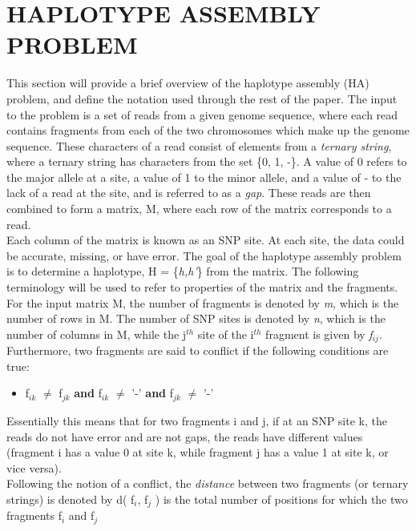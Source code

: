 \documentclass[10pt,twocolumn]{witseiepaper}
\begin{document}

\section{HAPLOTYPE ASSEMBLY PROBLEM}

This section will provide a brief overview of the haplotype assembly (HA) problem, and define the
notation used through the rest of the paper. The input to the problem is a set of reads from a given genome
sequence, where each read contains fragments from each of the two chromosomes which make up the genome
sequence. These characters of a read consist of elements from a \textit{ternary string}, where a ternary
string has characters from the set \{0, 1, -\}. A value of 0 refers to the major allele
at a site, a value of 1 to the minor allele, and a value of - to the lack of a read at the site, and is
referred to as a \textit{gap}. These reads are then combined to form a matrix, M, where each row of the 
matrix corresponds to a read. \\
Each column of the matrix is known as an SNP site. At each site, the data could be accurate, missing, or have
error. The goal of the haplotype assembly problem is to determine a haplotype, H = \{\textit{h,h'}\}
from the matrix. The following terminology will be used to refer to properties of the matrix and the
fragments. \\
For the input matrix M, the number of fragments is denoted by \textit{m}, which is the number of rows in M.
The number of SNP sites is denoted by \textit{n}, which is the number of columns in M, while the j$^{th}$ 
site of the i$^{th}$ fragment is given by \textit{f$_{ij}$}. Furthermore, two fragments are said to 
conflict if the following conditions are true:
\begin{itemize}
    \item{f$_{ik}$ $\neq$ f$_{jk}$ \textbf{and} f$_{ik}$ $\neq$ '-' \textbf{and} f$_{jk}$ $\neq$ '-' }
\end{itemize}
Essentially this means that for two fragments i and j, if at an SNP site k, the reads do not have error and are 
not gaps, the reads have different values (fragment i has a value 0 at site k, while fragment j has a value 
1 at site k, or vice versa). \\
Following the notion of a conflict, the \textit{distance} between two fragments (or ternary strings) is
denoted by d( f$_i$, f$_j$ ) is the total number of positions for which the two fragments f$_i$ and f$_j$
\end{document}

